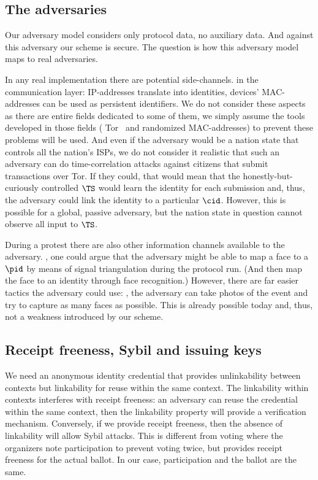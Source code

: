 


\subsection{The adversaries}

Our adversary model considers only protocol data, no auxiliary data.
And against this adversary our scheme is secure.
The question is how this adversary model maps to real adversaries.

In any real implementation there are potential side-channels.
\Eg in the communication layer: IP-addresses translate into identities, 
devices' MAC-addresses can be used as persistent identifiers.
We do not consider these aspects as there are entire fields dedicated to some 
of them, we simply assume the tools developed in those fields (\eg 
Tor~\cite{Tor} and randomized MAC-addresses) to prevent these problems will be 
used.
And even if the adversary would be a nation state that controls all the 
nation's \acp{ISP}, we do not consider it realistic that such an adversary can 
do \eg time-correlation attacks against citizens that submit transactions over 
Tor.
If they could, that would mean that the honestly-but-curiously controlled 
\(\TS\) would learn the identity for each submission and, thus, the adversary 
could link the identity to a particular \(\cid\).
However, this is possible for a global, passive adversary, but the nation state 
in question cannot observe all input to \(\TS\).

During a protest there are also other information channels available to the 
adversary.
\Eg, one could argue that the adversary might be able to map a face to a 
\(\pid\) by means of signal triangulation during the protocol run.
(And then map the face to an identity through face recognition.)
However, there are far easier tactics the adversary could use: \eg, the 
adversary can take photos of the event and try to capture as many faces as 
possible.
This is already possible today and, thus, not a weakness introduced by our 
scheme.


\subsection{Receipt freeness, Sybil and issuing keys}

We need an anonymous identity credential that provides unlinkability between 
contexts but linkability for reuse within the same context.
The linkability within contexts interferes with receipt freeness: an adversary 
can reuse the credential within the same context, then the linkability property 
will provide a verification mechanism.
Conversely, if we provide receipt freeness, then the absence of linkability 
will allow Sybil attacks.
This is different from voting where the organizers note participation to 
prevent voting twice, but provides receipt freeness for the actual ballot.
In our case, participation and the ballot are the same.

